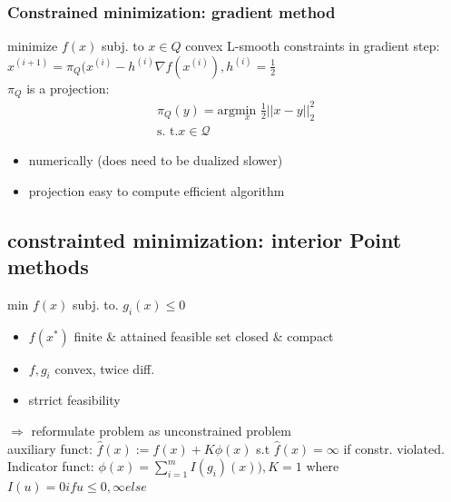 \subsubsection{Constrained minimization: gradient method}
minimize $f(x)$ subj. to $x\in Q $ convex L-smooth constraints in gradient step: $x^{(i+1)} = \pi _Q (x^{(i)}- h^{(i)} \nabla f(x^{(i)}), h^{(i)} = \frac{1}{2}$\\
$\pi_Q$ is a projection: \begin{gather*}
    \pi_Q (y) = \textrm{arg} \underset{x}{\textrm{min }} \frac{1}{2}||x-y||_2^2\\
    \textrm{s. t.} x \in \mathcal{Q}
\end{gather*}
\begin{itemize}
    \item numerically (does need to be dualized slower)
    \item projection easy to compute efficient algorithm
\end{itemize}

\subsection{constrainted minimization: interior Point methods}
min $f(x)$ subj. to. $g_i(x) \leq 0$
\begin{itemize}
    \item $f(x^*)$ finite \& attained feasible set closed \& compact
    \item $f,g_i$ convex, twice diff.
    \item strrict feasibility
\end{itemize}
$\Rightarrow $ reformulate problem as unconstrained problem \\
auxiliary funct: $\hat{f}(x) := f(x) + K \phi (x)$ s.t $\hat{f}(x) = \infty$ if constr. violated.\\
Indicator funct: $\phi (x) = \sum^m_{i=1}I(g_i)(x)), K=1$ where $I (u) = 0 if u \leq 0, \infty else$
\vfill\null\columnbreak
